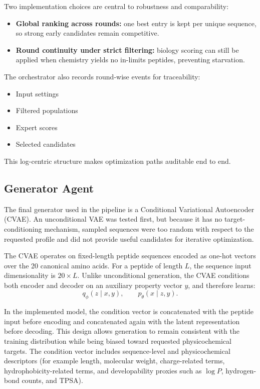Two implementation choices are central to robustness and comparability:
\begin{itemize}
	\item \textbf{Global ranking across rounds:} one best entry is kept per unique sequence, so strong early candidates remain competitive.
	\item \textbf{Round continuity under strict filtering:} biology scoring can still be applied when chemistry yields no in-limits peptides, preventing starvation.
\end{itemize}
The orchestrator also records round-wise events for traceability:
\begin{itemize}
	\item Input settings
	\item Filtered populations
	\item Expert scores
	\item Selected candidates
\end{itemize}
This log-centric structure makes optimization paths auditable end to end.

\subsection{Generator Agent}\label{subsec:designer}
The final generator used in the pipeline is a Conditional Variational Autoencoder (CVAE). An unconditional VAE was tested first, but because it has no target-conditioning mechanism, sampled sequences were too random with respect to the requested profile and did not provide useful candidates for iterative optimization.

The CVAE operates on fixed-length peptide sequences encoded as one-hot vectors over the 20 canonical amino acids. For a peptide of length $L$, the sequence input dimensionality is $20 \times L$. Unlike unconditional generation, the CVAE conditions both encoder and decoder on an auxiliary property vector $y$, and therefore learns:
\begin{equation}
q_{\phi}(z \mid x, y), \qquad p_{\theta}(x \mid z, y).
\end{equation}

In the implemented model, the condition vector is concatenated with the peptide input before encoding and concatenated again with the latent representation before decoding. This design allows generation to remain consistent with the training distribution while being biased toward requested physicochemical targets. The condition vector includes sequence-level and physicochemical descriptors (for example length, molecular weight, charge-related terms, hydrophobicity-related terms, and developability proxies such as \(\log P\), hydrogen-bond counts, and TPSA).

